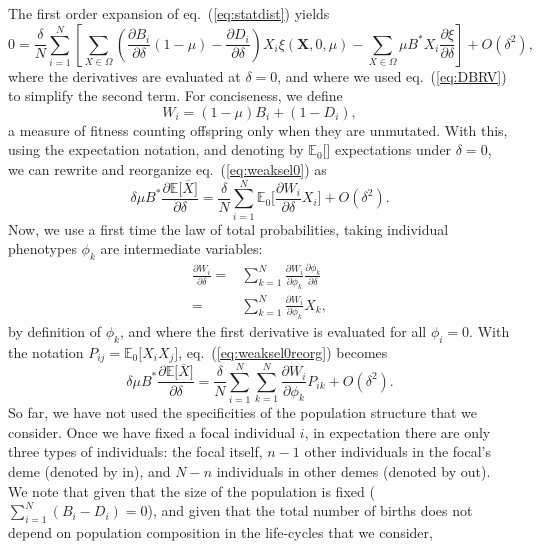 \documentclass[11pt, letterpaper]{article}
\renewcommand{\eqref}[1]{\textup{{\normalfont eq.~(\ref{#1}}\normalfont)}}
\newcommand{\derivn}[2]{\frac{\partial #1}{\partial #2}}
\newcommand{\Esp}[1]{\mathbb{E}\big[ #1\big]}%
\newcommand{\Espzero}[1]{\mathbb{E}_0\big[ #1\big]}%
\newcommand{\bigO}[1]{O\left( #1 \right)}
\newcommand{\inn}{\textrm{in}}
\newcommand{\out}{\textrm{out}}
\newcommand{\selstr}{\delta}
\begin{document}
The first order expansion of \eqref{eq:statdist} yields
%
\begin{equation}\label{eq:weaksel0}
0 = \frac{\selstr}{N} \sum_{i=1}^N \left[ \sum_{X\in \Omega} \left( \derivn{B_i}{\selstr} (1-\mu) - \derivn{D_i}{\selstr} \right) X_i  \xi(\mathbf{X}, 0, \mu) - \sum_{X\in \Omega} \mu B^* X_i  \derivn{\xi}{\selstr}\right]  + \bigO{\selstr^2},
\end{equation}
%
where the derivatives are evaluated at $\selstr = 0$, and where we used \eqref{eq:DBRV} to simplify the second term. For conciseness, we define 
%
\begin{equation}\label{eq:app:defW}
W_i = (1-\mu) B_i + (1-D_i), 
\end{equation}
%
a measure of fitness counting offspring only when they are unmutated. With this, using the expectation notation, and denoting by $\Espzero{}$ expectations under $\selstr = 0$, we can rewrite and reorganize \eqref{eq:weaksel0} as
%
\begin{equation}\label{eq:weaksel0reorg}
\selstr \mu B^* \derivn{\Esp{\overline{X}}}{\selstr} = \frac{\selstr}{N} \sum_{i=1}^N \Espzero{ \derivn{W_i}{\selstr} X_i } + \bigO{\selstr^2}.
\end{equation}
%
Now, we use a first time the law of total probabilities, taking individual phenotypes $\phi_k$ are intermediate variables:
%
\begin{align}
\derivn{W_i}{\selstr} =& \sum_{k=1}^N \derivn{W_i}{\phi_k} \derivn{\phi_k}{\selstr} \nonumber \\
=& \sum_{k=1}^N \derivn{W_i}{\phi_k} X_k,
\label{eq:totalproba1}
\end{align}
%
by definition of $\phi_k$, and where the first derivative is evaluated for all $\phi_i = 0$. With the notation $P_{ij} = \Espzero{X_i X_j}$, \eqref{eq:weaksel0reorg} becomes
%
\begin{equation}\label{eq:weaksel1}
\selstr \mu B^* \derivn{\Esp{\overline{X}}}{\selstr} = \frac{\selstr}{N} \sum_{i=1}^N \sum_{k=1}^N \derivn{W_i}{\phi_k} P_{ik} + \bigO{\selstr^2}.
\end{equation}
%
So far, we have not used the specificities of the population structure that we consider. Once we have fixed a focal individual $i$, in expectation there are only three types of individuals: the focal itself, $n-1$ other individuals in the focal's deme (denoted by $\inn$), and $N - n$ individuals in other demes (denoted by $\out$). We note that given that the size of the population is fixed ($\sum_{i=1}^N (B_i-D_i)=0$), and given that the total number of births does not depend on population composition in the life-cycles that we consider, 
\end{document}
